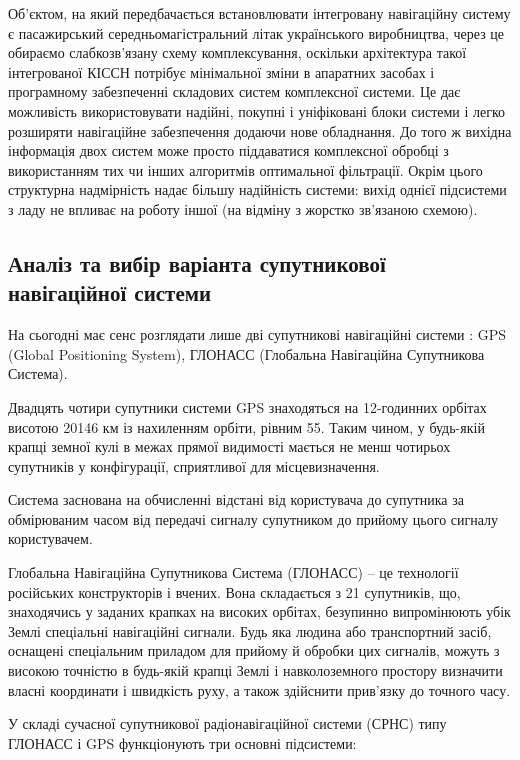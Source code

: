 Об'єктом, на який передбачається встановлювати інтегровану навігаційну систему є пасажирський середньомагістральний літак українського виробництва, через це обираємо  слабкозв’язану схему комплексування, оскільки архітектура такої інтегрованої КІССН потрібує мінімальної зміни в апаратних засобах і програмному забезпеченні складових систем комплексної системи. Це дає можливість використовувати надійні, покупні і уніфіковані блоки системи і легко розширяти навігаційне забезпечення додаючи нове обладнання. До того ж вихідна інформація двох систем може просто піддаватися комплексної обробці з використанням тих чи інших алгоритмів оптимальної фільтрації. Окрім цього структурна надмірність надає більшу надійність системи: вихід однієї підсистеми з ладу не впливає на роботу іншої (на відміну з жорстко зв’язаною схемою).

\subsection{Аналіз та вибір варіанта супутникової навігаційної системи}

На сьогодні має сенс розглядати лише дві супутникові навігаційні системи : GPS (Global Positioning System), 
ГЛОНАСС (Глобальна Навігаційна Супутникова Система).

Двадцять чотири супутники системи GPS знаходяться на 12-годинних орбітах висотою 
20146 км із нахиленням орбіти, рівним 55. Таким чином, 
у будь-якій крапці земної кулі в межах прямої видимості мається не менш чотирьох супутників 
у конфігурації, сприятливої для місцевизначення.

Система заснована на обчисленні відстані від користувача до супутника за обмірюваним часом 
від передачі сигналу супутником до прийому цього сигналу користувачем.

Глобальна Навігаційна Супутникова Система (ГЛОНАСС) -- це технології російських конструкторів і вчених.
Вона складається 
з 21 супутників, що, знаходячись у заданих крапках на високих орбітах, безупинно випромінюють 
убік Землі спеціальні навігаційні сигнали. Будь яка людина або транспортний засіб, оснащені 
спеціальним приладом для прийому й обробки цих сигналів, можуть з високою точністю в 
будь-якій крапці Землі і навколоземного простору визначити власні координати і швидкість 
руху, а також здійснити прив'язку до точного часу.

У складі сучасної супутникової радіонавігаційної системи (СРНС) типу ГЛОНАСС і
GPS функціонують три основні підсистеми:

